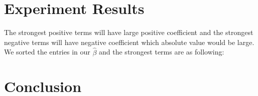 \documentclass[paper=a4, fontsize=11pt]{scrartcl} %
\numberwithin{equation}{section} %
\numberwithin{figure}{section} %
\numberwithin{table}{section} %
\begin{document}
\section{Experiment Results}
The strongest positive terms will have large positive coefficient and the strongest negative terms will have negative coefficient which  absolute value would be large. We sorted the entries in our $\hat{\beta}$ and the strongest terms are as following:






\section{Conclusion}
\end{document}
